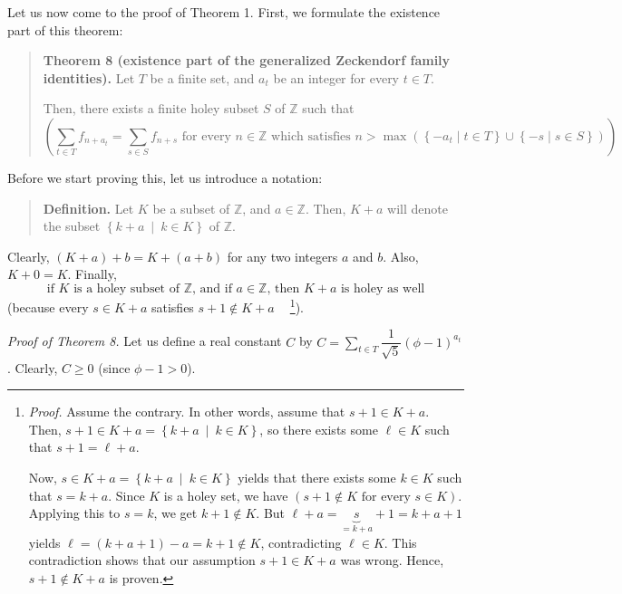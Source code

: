 \documentclass[12pt,final,notitlepage,onecolumn]{article}%
\begin{document}
Let us now come to the proof of Theorem 1. First, we formulate the existence
part of this theorem:

\begin{quote}
\textbf{Theorem 8 (existence part of the generalized Zeckendorf family
identities).} Let $T$ be a finite set, and $a_{t}$ be an integer for every
$t\in T$.

Then, there exists a finite holey subset $S$ of $\mathbb{Z}$ such that
\[
\left(  \sum\limits_{t\in T}f_{n+a_{t}}=\sum\limits_{s\in S}f_{n+s}\text{ for
every }n\in\mathbb{Z}\text{ which satisfies }n>\max\left(  \left\{  -a_{t}\mid
t\in T\right\}  \cup\left\{  -s\mid s\in S\right\}  \right)  \right)  .
\]



\end{quote}

Before we start proving this, let us introduce a notation:

\begin{quote}
\textbf{Definition.} Let $K$ be a subset of $\mathbb{Z}$, and $a\in\mathbb{Z}%
$. Then, $K+a$ will denote the subset $\left\{  k+a\ \mid\ k\in K\right\}  $
of $\mathbb{Z}$.
\end{quote}

Clearly, $\left(  K+a\right)  +b=K+\left(  a+b\right)  $ for any two integers
$a$ and $b$. Also, $K+0=K$. Finally,%
\begin{equation}
\text{if }K\text{ is a holey subset of }\mathbb{Z}\text{, and if }%
a\in\mathbb{Z}\text{, then }K+a\text{ is holey as well} \label{holey-plus}%
\end{equation}
(because every $s\in K+a$ satisfies $s+1\notin K+a\ \ \ \ $%
\footnote{\textit{Proof.} Assume the contrary. In other words, assume that
$s+1\in K+a$. Then, $s+1\in K+a=\left\{  k+a\ \mid\ k\in K\right\}  $, so
there exists some $\ell\in K$ such that $s+1=\ell+a$.
\par
Now, $s\in K+a=\left\{  k+a\ \mid\ k\in K\right\}  $ yields that there exists
some $k\in K$ such that $s=k+a$. Since $K$ is a holey set, we have $\left(
s+1\notin K\text{ for every }s\in K\right)  $. Applying this to $s=k$, we get
$k+1\notin K$. But $\ell+a=\underbrace{s}_{=k+a}+1=k+a+1$ yields $\ell=\left(
k+a+1\right)  -a=k+1\notin K$, contradicting $\ell\in K$. This contradiction
shows that our assumption $s+1\in K+a$ was wrong. Hence, $s+1\notin K+a$ is
proven.}).

\textit{Proof of Theorem 8.} Let us define a real constant $C$ by
$C=\sum\limits_{t\in T}\dfrac{1}{\sqrt{5}}\left(  \phi-1\right)  ^{a_{t}}$.
Clearly, $C\geq0$ (since $\phi-1>0$).
\end{document}
